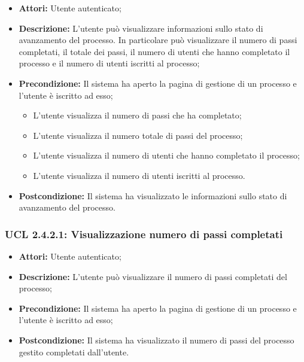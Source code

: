 \begin{itemize}
\item \textbf{Attori:} Utente autenticato;
\item \textbf{Descrizione:} L'utente può visualizzare informazioni sullo stato di avanzamento del processo. In particolare può visualizzare il numero di passi completati, il totale dei passi, il numero di utenti che hanno completato il processo e il numero di utenti iscritti al processo;
\item \textbf{Precondizione:} Il sistema ha aperto la pagina di gestione di un processo e l'utente è iscritto ad esso;
\begin{itemize}
\item L'utente visualizza il numero di passi che ha completato;
\item L'utente visualizza il numero totale di passi del processo;
\item L'utente visualizza il numero di utenti che hanno completato il processo;
\item L'utente visualizza il numero di utenti iscritti al processo.
\end{itemize}
\item \textbf{Postcondizione:} Il sistema ha visualizzato le informazioni sullo stato di avanzamento del processo.
\end{itemize}

\hypertarget{L2.4.2.1}{}
\subsubsection{UCL 2.4.2.1: Visualizzazione numero di passi completati}
\begin{itemize}
\item \textbf{Attori:} Utente autenticato;
\item \textbf{Descrizione:} L'utente può visualizzare il numero di passi completati del processo;
\item \textbf{Precondizione:} Il sistema ha aperto la pagina di gestione di un processo e l'utente è iscritto ad esso;
\item \textbf{Postcondizione:} Il sistema ha visualizzato il numero di passi del processo gestito completati dall'utente.
\end{itemize}

